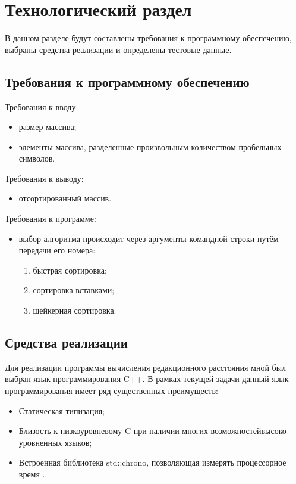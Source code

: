 \chapter{Технологический раздел}
\label{cha:impl}

В данном разделе будут составлены требования к программному обеспечению, выбраны средства реализации и определены тестовые данные.

\section{Требования к программному обеспечению}
Требования к вводу:
\begin{itemize}
    \item размер массива;
    \item элементы массива, разделенные произвольным количеством пробельных символов.
\end{itemize}

Требования к выводу:
\begin{itemize}
    \item отсортированный массив.
\end{itemize}

Требования к программе:
\begin{itemize}
    \item выбор алгоритма происходит через аргументы командной строки путём передачи его номера:
        \begin{enumerate}[1)]
            \item быстрая сортировка;
            \item сортировка вставками;
            \item шейкерная сортировка.
        \end{enumerate}

\end{itemize}

\section{Средства реализации}
Для реализации программы вычисления редакционного расстояния мной был выбран язык программирования C++. В рамках текущей задачи данный язык программирования имеет ряд существенных преимуществ:
\begin{itemize}
    \item Статическая типизация;
    \item Близость к низкоуровневому C при наличии многих возможностейвысоко уровненных языков;
    \item Встроенная библиотека std::chrono, позволяющая измерять процессорное время \cite{chrono}.
\end{itemize}

